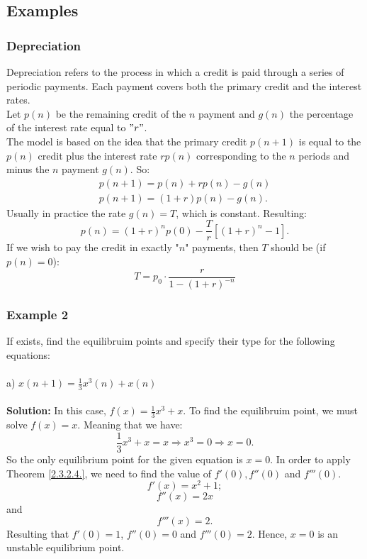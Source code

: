 \documentclass[a4paper,12pt]{report}
\begin{document}
\subsection{Examples}

\subsubsection{Depreciation}

Depreciation refers to the process in which a credit is paid through a series of periodic payments. Each payment covers both the primary credit and the interest rates.\\
Let $p(n)$ be the remaining credit of the $n$ payment and $g(n)$ the percentage of the interest rate equal to $"r"$. \\
The model is based on the idea that the primary credit $p(n+1)$ is equal to the $p(n)$ credit plus the interest rate $rp(n)$ corresponding to the $n$ periods and minus the $n$ payment $g(n)$. So:
\begin{align*}
 p(n+1)=p(n)+rp(n)-g(n)\\
 p(n+1)=(1+r)p(n)-g(n).
\end{align*}
Usually in practice the rate $g(n)=T$, which is constant. Resulting:
\begin{equation}
 p(n)=(1+r)^{n}p(0)-\frac{T}{r}[(1+r)^{n}-1].
\end{equation}
If we wish to pay the credit in exactly "$n$" payments, then $T$ should be (if $p(n)=0$):
$$T=p_{0}\cdot\frac{r}{1-(1+r)^{-n}}$$ 

\subsubsection{Example 2} If exists, find the equilibruim points and specify their type for the following equations:\\ \\
a) $x(n+1)=\frac{1}{3}x^{3}(n)+x(n)$\\ \\
\textbf{Solution:}
In this case, $f(x)=\frac{1}{3}x^{3}+x$. To find the equilibruim point, we must solve $f(x)=x$. Meaning that we have:
$$\frac{1}{3} x^{3}+x=x \Rightarrow x^{3}=0 \Rightarrow x=0.$$
So the only equilibrium point for the given equation is $x=0$. In order to apply Theorem \ref{2.3.2.4.}, we need to find the value of $f'(0), f''(0)$ and $f'''(0).$ 
$$f'(x)=x^{2}+1;$$
$$f''(x)=2x$$ and
$$f'''(x)=2.$$
Resulting that $f'(0)=1$, $f''(0)=0$ and $f'''(0)=2$. Hence, $x=0$ is an unstable equilibrium point.\\
\end{document}
